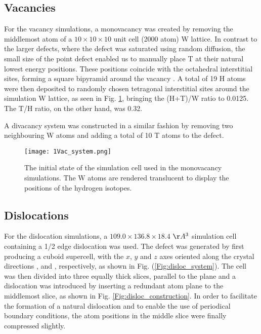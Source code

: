 \subsection{Vacancies}
For the vacancy simulations, a monovacancy was created by removing the middlemost atom of a $10\times 10 \times 10$ unit cell (2000 atom) W lattice.  
In contrast to the larger defects, where the defect was saturated using random diffusion, the small size of the point defect enabled us to manually place T at their natural lowest energy positions.
These positions coincide with the octahedral interstitial sites, forming a square bipyramid around the vacancy \cite{heinolaTungstenDFT}.
A total of 19 H atoms were then deposited to randomly chosen tetragonal interstitial sites around the simulation W lattice, as seen in Fig. \ref{Fig:monovac_system}, bringing the (H+T)/W ratio to 0.0125. 
The T/H ratio, on the other hand, was 0.32.

A divacancy system was constructed in a similar fashion by removing two neighbouring W atoms and adding a total of 10 T atoms to the defect.

\begin{figure}[!ht]
\center
\texttt{[image: 1Vac\_system.png]}
\caption{The initial state of the simulation cell used in the monovacancy simulations. 
The W atoms are rendered translucent to display the positions of the hydrogen isotopes.}
\label{Fig:monovac_system}
\end{figure}

\subsection{Dislocations}
For the dislocation simulations, a  $109.0 \times 136.8 \times 18.4$ $\AA^3$ simulation cell containing a 1/2\hkl[1 1 1] edge dislocation was used. 
The defect was generated by first producing a cuboid supercell, with the $x$, $y$ and $z$ axes oriented along the crystal directions \hkl[1 1 1], \hkl[1 1 -2] and \hkl[-1 1 0], respectively, as shown in Fig. (\ref{Fig:disloc_system}). 
The cell was then divided into three equally thick slices, parallel to the  plane and a dislocation was introduced by inserting a redundant  atom plane to the middlemost slice, as shown in Fig. \ref{Fig:disloc_construction}. 
In order to facilitate the formation of a natural dislocation and to enable the use of periodical boundary conditions, the atom positions in the middle slice were finally compressed slightly.


